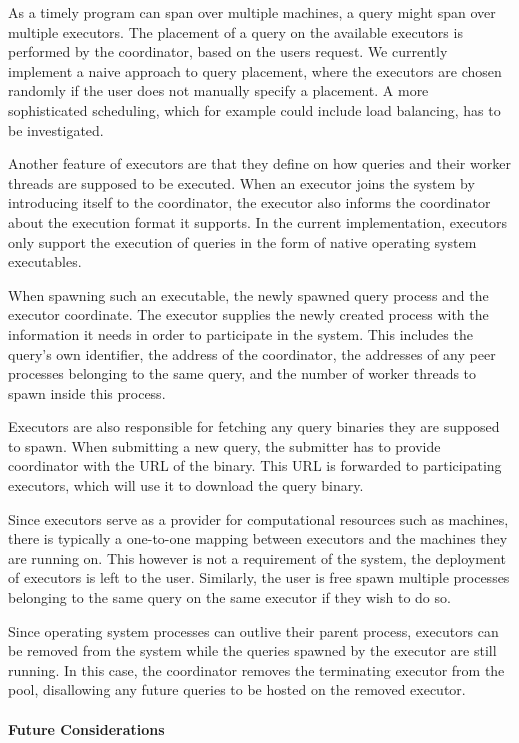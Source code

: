 As a timely program can span over multiple machines, a query might span
over multiple executors. The placement of a query on the available executors
is performed by the coordinator, based on the users request.
We currently implement a naive approach to query placement, where the executors
are chosen randomly if the user does not manually specify a placement. A more
sophisticated scheduling, which for example could include load balancing,
has to be investigated.

Another feature of executors are that they define on how queries and their
worker threads are supposed to be executed. When an executor joins
the system by introducing itself to the coordinator, the executor also informs
the coordinator about the execution format it supports. In the current
implementation, executors only support the execution of queries in the form of
native operating system executables.

When spawning such an executable, the newly spawned query process and the
executor coordinate. The executor supplies the newly created process with the information
it needs in order to participate in the system. This includes the query's own identifier,
the address of the coordinator, the addresses of any peer processes belonging to the 
same query, and the number of worker threads to spawn inside this process.

Executors are also responsible for fetching any query binaries they are supposed
to spawn. When submitting a new query, the submitter has to provide coordinator
with the URL of the binary. This URL is forwarded to participating executors,
which will use it to download the query binary. 

Since executors serve as a provider for computational resources such as machines,
there is typically a one-to-one mapping between executors and the machines they
are running on. This however is not a requirement of the system, the deployment of
executors is left to the user. Similarly, the user is free spawn multiple
processes belonging to the same query on the same executor if they wish to do so.

Since operating system processes can outlive their parent process, executors can
be removed from the system while the queries spawned by the executor are still
running. In this case, the coordinator removes the terminating executor from
the pool, disallowing any future queries to be hosted on the removed executor.

\paragraph{Future Considerations}

